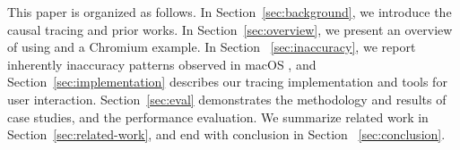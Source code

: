 This paper is organized as follows. In Section~\ref{sec:background}, we
introduce the causal tracing and prior works. In Section~\ref{sec:overview},
we present an overview of using \xxx and a Chromium example. In
Section ~\ref{sec:inaccuracy}, we report inherently inaccuracy
patterns observed in macOS , and Section~\ref{sec:implementation}
describes our tracing implementation and tools for user interaction.
Section~\ref{sec:eval} demonstrates the methodology and results of case
studies, and the performance evaluation. We summarize related work
in Section~\ref{sec:related-work}, and end with conclusion in Section
~\ref{sec:conclusion}.
